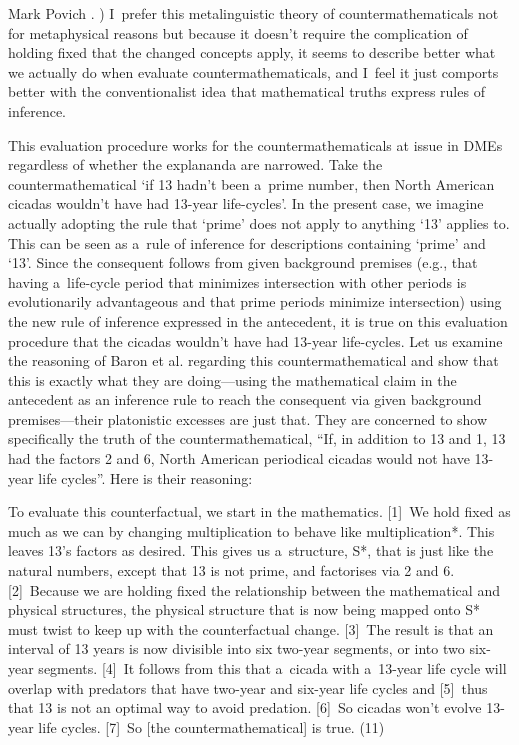 \begin{artengenv}{Mark Povich}
{%
\parencite[][p.303]{bennett_philosophical_2003}.%
) I~prefer this metalinguistic theory of countermathematicals not for metaphysical reasons but because it doesn't require the complication of holding fixed that the changed concepts apply, it seems to describe better what we actually do when evaluate countermathematicals, and I~feel it just comports better with the conventionalist idea that mathematical truths express rules of inference.}

This evaluation procedure works for the countermathematicals at issue in DMEs regardless of whether the explananda are narrowed. Take the countermathematical ‘if 13 hadn't been a~prime number, then North American cicadas wouldn't have had 13-year life-cycles'. In the present case, we imagine actually adopting the rule that ‘prime' does not apply to anything ‘13' applies to. This can be seen as a~rule of inference for descriptions containing ‘prime' and ‘13'. Since the consequent follows from given background premises (e.g., that having a~life-cycle period that minimizes intersection with other periods is evolutionarily advantageous and that prime periods minimize intersection) using the new rule of inference expressed in the antecedent, it is true on this evaluation procedure that the cicadas wouldn't have had 13-year life-cycles. Let us examine the reasoning of Baron et al.
\parencite*[][p.11]{baron_how_2017} %
 regarding this countermathematical and show that this is exactly what they are doing---using the mathematical claim in the antecedent as an inference rule to reach the consequent via given background premises---their platonistic excesses are just that. They are concerned to show specifically the truth of the countermathematical, ``If, in addition to 13 and 1, 13 had the factors 2 and 6, North American periodical cicadas would not have 13-year life cycles''. Here is their reasoning:

To evaluate this counterfactual, we start in the mathematics. [1]~We hold fixed as much as we can by changing multiplication to behave like multiplication*. This leaves 13's factors as desired. This gives us a~structure, S*, that is just like the natural numbers, except that 13 is not prime, and factorises via 2 and 6. [2]~Because we are holding fixed the relationship between the mathematical and physical structures, the physical structure that is now being mapped onto S* must twist to keep up with the counterfactual change. [3]~The result is that an interval of 13 years is now divisible into six two-year segments, or into two six-year segments. [4]~It follows from this that a~cicada with a~13-year life cycle will overlap with predators that have two-year and six-year life cycles and [5]~thus that 13 is not an optimal way to avoid predation. [6]~So cicadas won't evolve 13-year life cycles. [7]~So [the countermathematical] is true. (11)


\end{artengenv}
